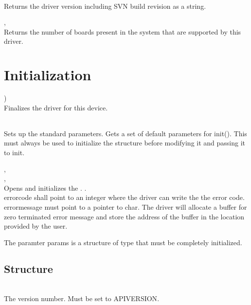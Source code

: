 	\\
	Returns the driver version including SVN build revision as a string. 

	, \\
	\label{countdevices}
	Returns the number of boards present in the system that are supported by this driver.\par


\section {Initialization}

		\device )\\
		Finalizes the driver for this device.

		\\
		Sets up the standard parameters. Gets a set of default parameters for \textsf{\prefix init()}. 
		This must always be used to initialize the \textsf{\initparameters} structure before modifying it 
		and passing it to \textsf{\prefix init}.\par

		, \\ 
		, \\
		Opens and initializes the \deviceName. 
		. \\
		\textsf{error\tu code} shall point to an integer where the driver can write the the error code. \\
		\textsf{error\tu message} must point to a pointer to char. 
		The driver will allocate a buffer for zero terminated error message and store the address of the buffer in the location provided by the user.\par

		The paramter \textsf{params} is a structure of type \textsf{\initparameters} that must be completely initialized.\par


		\subsection{Structure \initparameters}
			\\
			The version number. Must be set to \textsf{\PREFIX API\tu VERSION}.\par

